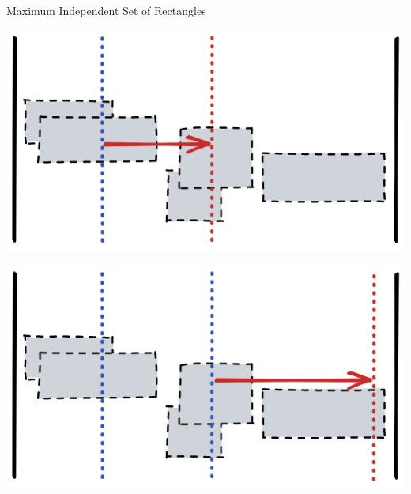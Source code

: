 \documentclass[handout,usenames,dvipsnames]{beamer}
\begin{document}
\begin{frame}{Maximum Independent Set of Rectangles}
    \begin{minipage}{0.45\textwidth}
        
        \includegraphics[width=\textwidth]{l1c2.png}
    \end{minipage}\hfill
    \begin{minipage}{0.45\textwidth}
        \begin{center}
            \includegraphics[width=\textwidth]{l1c3.png}
        \end{center}
    \end{minipage}
\end{frame}
\end{document}
